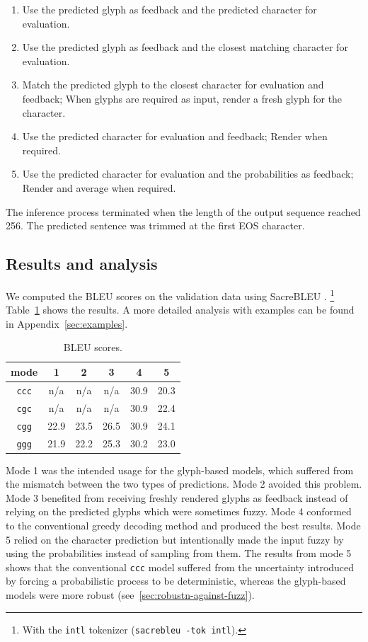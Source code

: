 \documentclass[11pt,twocolumn]{article}
\begin{document}
\begin{enumerate}
\item Use the predicted glyph as feedback and the predicted character for evaluation.
\item Use the predicted glyph as feedback and the closest matching character for evaluation.
\item Match the predicted glyph to the closest character for evaluation and feedback;
  When glyphs are required as input, render a fresh glyph for the character.
\item Use the predicted character for evaluation and feedback; Render when required.
\item Use the predicted character for evaluation and the probabilities as feedback; Render and average when required.
\end{enumerate}

The inference process terminated when the length of the output sequence reached 256.
The predicted sentence was trimmed at the first EOS character.

\subsection{Results and analysis}\label{sec:results-analysis}

We computed the BLEU scores on the validation data using SacreBLEU \parencite{post2018call}.%
\footnote{With the \texttt{intl} tokenizer (\texttt{sacrebleu -tok intl}).}
Table~\ref{tab:bleu} shows the results.
A more detailed analysis with examples can be found in Appendix~\ref{sec:examples}.

\begin{table}[htbp]
  \centering
  \begin{tabular}[tb]{cccccc}
    \toprule
    mode &1 &2 &3 &4 &5\\
    \midrule
    \texttt{ccc} &n/a  &n/a  &n/a  &30.9 &20.3\\
    \texttt{cgc} &n/a  &n/a  &n/a  &30.9 &22.4\\
    \texttt{cgg} &22.9 &23.5 &26.5 &30.9 &24.1\\
    \texttt{ggg} &21.9 &22.2 &25.3 &30.2 &23.0\\
    \bottomrule
  \end{tabular}
  \caption[]{\label{tab:bleu}BLEU scores.}
\end{table}

Mode 1 was the intended usage for the glyph-based models,
which suffered from the mismatch between the two types of predictions.
Mode 2 avoided this problem.
Mode 3 benefited from receiving freshly rendered glyphs as feedback
instead of relying on the predicted glyphs which were sometimes fuzzy.
Mode 4 conformed to the conventional greedy decoding method and produced the best results.
Mode 5 relied on the character prediction but intentionally made the input fuzzy
by using the probabilities instead of sampling from them.
The results from mode 5 shows that the conventional \texttt{ccc} model suffered
from the uncertainty introduced by forcing a probabilistic process to be deterministic,
whereas the glyph-based models were more robust (see~\ref{sec:robustn-against-fuzz}).
\end{document}
